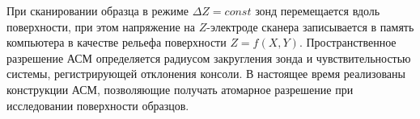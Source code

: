При сканировании образца в режиме $\Delta Z = const$ зонд перемещается вдоль поверхности, при этом напряжение на $Z$-электроде сканера записывается в память компьютера в качестве рельефа поверхности $Z = f(X, Y)$. Пространственное разрешение АСМ определяется радиусом закругления зонда и чувствительностью системы, регистрирующей отклонения консоли. В настоящее время реализованы конструкции АСМ, позволяющие получать атомарное разрешение при исследовании поверхности образцов.